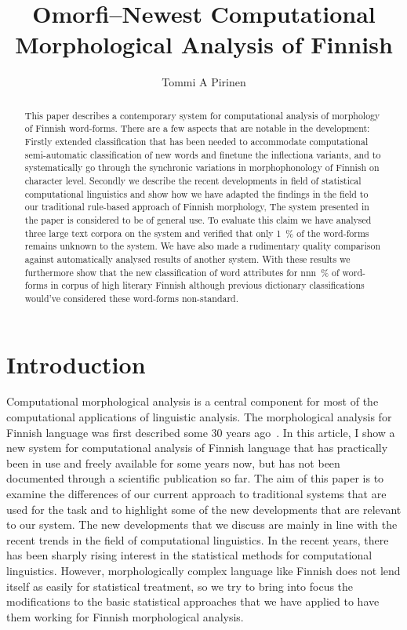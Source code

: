 \documentclass[a4paper,12pt]{article}
\title{Omorfi–Newest Computational Morphological Analysis of Finnish}
\author{Tommi A Pirinen}
\begin{document}
\maketitle

\begin{abstract}

    This paper describes a contemporary system for computational analysis of
    morphology of Finnish word-forms. There are a few aspects that are notable
    in the development: Firstly extended classification that has been needed to
    accommodate computational semi-automatic classification of new words and
    finetune the inflectiona variants, and to systematically go through the
    synchronic variations in morphophonology of Finnish on character level.
    Secondly we describe the recent developments in field of statistical
    computational linguistics and show how we have adapted the findings in
    the field to our traditional rule-based approach of Finnish morphology,
    The system presented in the paper is considered to be of general use. To
    evaluate this claim we have analysed three large text corpora on the system
    and verified that only 1~\% of the word-forms remains unknown to the system.
    We have also made a rudimentary quality comparison against automatically
    analysed results of another system. With these results we furthermore
    show that the new classification of word attributes for nnn~\% of word-forms
    in corpus of high literary Finnish although previous dictionary
    classifications would've considered these word-forms non-standard.

\end{abstract}

\section{Introduction}

Computational morphological analysis is a central component for most of the
computational applications of linguistic analysis. The morphological analysis
for Finnish language was first described some 30 years ago~\cite{}. In this
article, I show a new system for computational analysis of Finnish language that
has practically been in use and freely available for some years now, but has not
been documented through a scientific publication so far. The aim of this paper
is to examine the differences of our current approach to traditional systems
that are used for the task and to highlight some of the new developments that
are relevant to our system. The new developments that we discuss are mainly
in line with the recent trends in the field of computational linguistics. In the
recent years, there has been sharply rising interest in the statistical methods
for computational linguistics. However, morphologically complex language like
Finnish does not lend itself as easily for statistical treatment, so we try
to bring into focus the modifications to the basic statistical approaches that
we have applied to have them working for Finnish morphological analysis.
\end{document}
